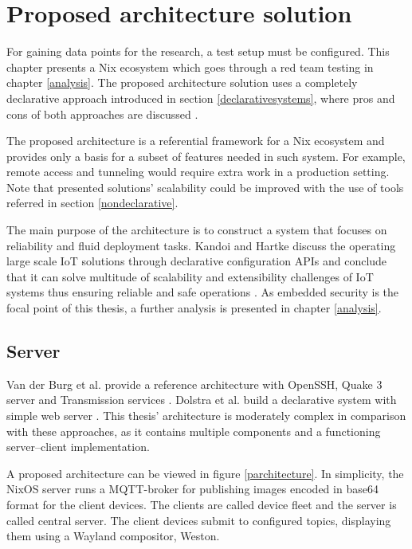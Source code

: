 \chapter{Proposed architecture solution} \label{architecture}

For gaining data points for the research, a test setup must be
configured. This chapter presents a Nix ecosystem which goes through
a red team testing in chapter \ref{analysis}. The proposed
architecture solution uses a completely declarative approach
introduced in section \ref{declarativesystems}, where pros and cons of both approaches are
discussed .

The proposed architecture is a referential framework for a Nix
ecosystem and provides only a basis for a subset of features needed in
such system. For example, remote access and tunneling would require
extra work in a production setting. Note that presented solutions'
scalability could be improved with the use of tools referred in
section \ref{nondeclarative}.

The main purpose of the architecture is to construct a system that
focuses on reliability and fluid deployment tasks. Kandoi and Hartke
discuss the operating large scale IoT solutions through declarative
configuration APIs and conclude that it can solve multitude of
scalability and extensibility challenges of IoT systems thus ensuring
reliable and safe operations \cite{kandoi2021operating}. As embedded
security is the focal point of this thesis, a further analysis is
presented in chapter \ref{analysis}.

\section{Server}

Van der Burg et al. provide a reference architecture with OpenSSH,
Quake 3 server and Transmission services
\cite{van2013reference}. Dolstra et al.  build a declarative
system with simple web server \cite{dolstra2013charon}. This thesis'
architecture is moderately complex in comparison with these
approaches, as it contains multiple components and a functioning
server–client implementation.

A proposed architecture can be viewed in figure
\ref{parchitecture}. In simplicity, the NixOS server runs a
MQTT-broker for publishing images encoded in base64 format for the
client devices. The clients are called device fleet and the server
is called central server. The client devices submit to configured
topics, displaying them using a Wayland compositor, Weston.


